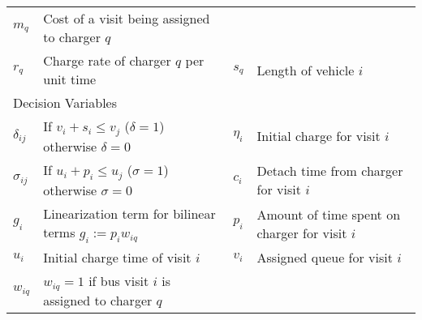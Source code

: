 \begin{table*}[!t]
\begin{tabular}{l l l l}
			$m_q$        & Cost of a visit being assigned to charger $q$                      \\
			$r_q$        & Charge rate of charger $q$ per unit time                           &
			$s_q$        & Length of vehicle $i$                                              \\
		\hline
		\multicolumn{4}{l}{Decision Variables} \\
			$\delta_{ij}$ & If $v_i + s_i \leq v_j$ ($\delta = 1$) otherwise $\delta = 0$ &
			$\eta_i$      & Initial charge for visit $i$                                 \\
			$\sigma_{ij}$ & If $u_i + p_i \leq u_j$ ($\sigma = 1$) otherwise $\sigma = 0$ &
			$c_i$         & Detach time from charger for visit $i$                       \\
			$g_i$         & Linearization term for bilinear terms $g_i := p_i w_{iq}$     &
			$p_i$         & Amount of time spent on charger for visit $i$                \\
			$u_i$         & Initial charge time of visit $i$                             &
			$v_i$         & Assigned queue for visit $i$                                 \\
     			$w_{iq}$      & $w_{iq} = 1$ if bus visit $i$ is assigned to charger $q$       \\
			\bottomrule
	\end{tabular}
\end{table*}
